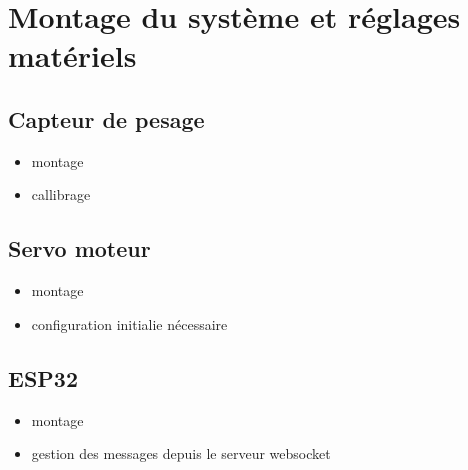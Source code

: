 \section{Montage du système et réglages matériels}
\subsection{Capteur de pesage}
\begin{itemize}
	\item montage 
	\item callibrage
\end{itemize}


\subsection{Servo moteur}
\begin{itemize}
	\item montage
	\item configuration initialie nécessaire
\end{itemize}


\subsection{ESP32}
\begin{itemize}
	\item montage
	\item gestion des messages depuis le serveur websocket
\end{itemize}


